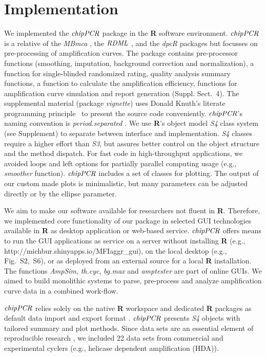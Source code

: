 \documentclass{bioinfo}
\begin{document}
\section{Implementation}
\begin{methods}
We implemented the $\emph{chipPCR}$ package in the \textbf{R} software 
environment. $\emph{chipPCR}$ is a relative of the \emph{MBmca} 
\citep{roediger_RJ_2013}, the $\emph{RDML}$ \citep{blagodatskikh_2014}, and the 
\emph{dpcR} \citep{pabinger_2014} packages but focusses on pre-processing of 
amplification curves. The package contains pre-processor functions (smoothing, 
imputation, background correction and normalization), a function for single-blinded 
randomized rating, quality analysis summary functions, a function to calculate 
the amplification efficiency, functions for amplification curve simulation and 
report 
generation (Suppl. Sect.~4). The supplemental material %
(package \textit{vignette}) uses Donald Knuth's literate programming 
principle~\citep{Knuth1984} to present the source code conveniently. 
$\emph{chipPCR}$'s naming convention is \textit{period.separated} 
\citep{Baaaath_2012}. We use \textbf{R}'s object model \emph{S4} class system 
(see Supplement) to separate between interface and implementation. \emph{S4} 
classes require a higher effort than \emph{S3}, but assures better control on 
the object structure and the method dispatch. For fast code in high-throughput 
applications, we avoided loops and left options for 
partially parallel computing usage (e.g., \textsl{smoother} function). 
$\emph{chipPCR}$ includes a set of classes for plotting. The output of our 
custom made plots is minimalistic, but many parameters can be adjusted directly 
or by the ellipse parameter.

We aim to make our software available for researchers not fluent in 
\textbf{R}. Therefore, we implemented core functionality of our package in 
selected GUI technologies available in \textbf{R} \citep{rodiger_rkward_2012} as 
desktop application or web-based service. $\emph{chipPCR}$ offers means to run 
the GUI applications as service on a server without installing \textbf{R} (e.g., 
http://michbur.shinyapps.io/MFIaggr\_gui), on the local 
desktop (e.g., Fig.~S2,~S6), or as deployed from an external %
source for a local \textbf{R} installation. The functions \textsl{AmpSim}, 
\textsl{th.cyc}, \textsl{bg.max} and \textsl{amptester} are part of online GUIs. 
We aimed to build monolithic systems to parse, pre-process and analyze 
amplification curve data in a combined work-flow. 

$\emph{chipPCR}$ relies solely on the native \textbf{R} 
workspace and dedicated \textbf{R} packages as default data import 
and export format \citep{perkins_2012,rodiger_rkward_2012,blagodatskikh_2014}. 
$\emph{chipPCR}$ presents \emph{S4} objects with tailored summary and plot 
methods. Since data sets are an essential element of reproducible research 
\citep{Leeper_2014}, we included 22 data sets from commercial and 
experimental cyclers (e.g., helicase 
dependent amplification (HDA)).
\end{methods}
\end{document}
